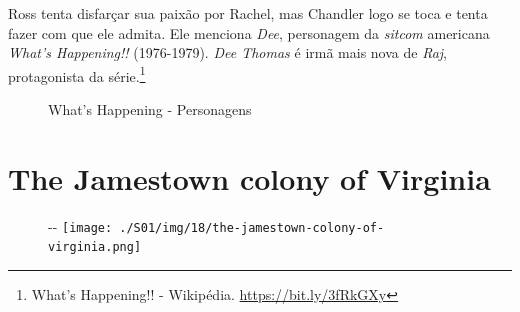 Ross tenta disfarçar sua paixão por Rachel, mas Chandler logo se toca e
tenta fazer com que ele admita. Ele menciona \emph{Dee}, personagem da
\emph{sitcom} americana \emph{What's Happening!!} (1976-1979). \emph{Dee
Thomas} é irmã mais nova de \emph{Raj}, protagonista da
série.\footnote{\sloppy What’s Happening!! - Wikipédia. \url{https://bit.ly/3fRkGXy}}

\begin{figure}
  \centering
    \caption{What’s Happening - Personagens\label{fig:what-s-happening-personagens}}
\end{figure}

\hypertarget{the-jamestown-colony-of-virginia}{%
\section{The Jamestown colony of
Virginia}\label{the-jamestown-colony-of-virginia}}

\begin{figure}[!ht]
  \begin{adjustwidth}{-\oddsidemargin-1in}{-\rightmargin}
    \centering
    \texttt{[image: ./S01/img/18/the-jamestown-colony-of-virginia.png]}
  \end{adjustwidth}
\end{figure}

